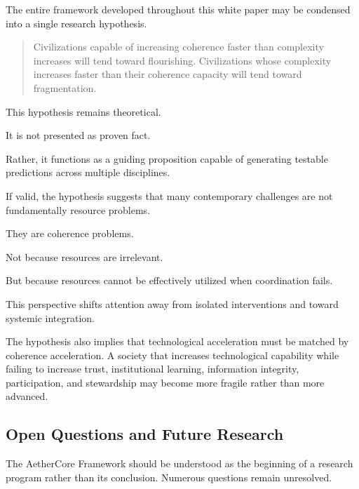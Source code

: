 \documentclass[12pt]{article}
\begin{document}
The entire framework developed throughout this white paper may be condensed into a single research hypothesis.

\begin{quote}
Civilizations capable of increasing coherence faster than complexity increases will tend toward flourishing. Civilizations whose complexity increases faster than their coherence capacity will tend toward fragmentation.
\end{quote}

This hypothesis remains theoretical.

It is not presented as proven fact.

Rather, it functions as a guiding proposition capable of generating testable predictions across multiple disciplines.

If valid, the hypothesis suggests that many contemporary challenges are not fundamentally resource problems.

They are coherence problems.

Not because resources are irrelevant.

But because resources cannot be effectively utilized when coordination fails.

This perspective shifts attention away from isolated interventions and toward systemic integration.

The hypothesis also implies that technological acceleration must be matched by coherence acceleration. A society that increases technological capability while failing to increase trust, institutional learning, information integrity, participation, and stewardship may become more fragile rather than more advanced.

\subsection{Open Questions and Future Research}

The AetherCore Framework should be understood as the beginning of a research program rather than its conclusion. Numerous questions remain unresolved.
\end{document}
